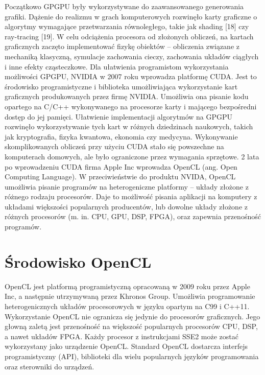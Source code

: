Początkowo GPGPU były wykorzystywane do zaawansowanego generowania grafiki. Dążenie do realizmu w grach komputerowych rozwinęło karty graficzne o algorytmy wymagające przetwarzania równoległego, takie jak shading [18] czy ray-tracing [19]. W celu odciążenia procesora od złożonych obliczeń, na kartach graficznych zaczęto implementować fizykę obiektów – obliczenia związane z mechaniką klasyczną, symulacje zachowania cieczy, zachowania układów ciągłych i inne efekty cząsteczkowe. Dla ułatwienia programistom wykorzystania możliwości GPGPU, NVIDIA w 2007 roku wprowadza platformę CUDA. Jest to środowisko programistyczne i biblioteka umożliwiająca wykorzystanie kart graficznych produkowanych przez firmę NVIDIA. Umożliwia ona pisanie kodu opartego na C/C++ wykonywanego na procesorze karty i mającego bezpośredni dostęp do jej pamięci. Ułatwienie implementacji algorytmów na GPGPU rozwinęło wykorzystywanie tych kart w różnych dziedzinach naukowych, takich jak kryptografia, fizyka kwantowa, ekonomia czy medycyna. Wykonywanie  skomplikowanych obliczeń przy użyciu CUDA stało się powszechne na komputerach domowych, ale było ograniczone przez wymagania sprzętowe. 2 lata po wprowadzeniu CUDA firma Apple Inc wprowadza OpenCL (ang. Open Computing Language). W przeciwieństwie do produktu NVIDA, OpenCL umożliwia pisanie programów na heterogeniczne platformy – układy złożone z różnego rodzaju procesorów. Daje to możliwość pisania aplikacji na komputery z układami większości popularnych producentów, lub dowolne układy złożone z różnych procesorów (m. in. CPU, GPU, DSP, FPGA), oraz zapewnia przenośność programów.


\section{Środowisko OpenCL}\label{sec:OpenCL}

OpenCL jest platformą programistyczną opracowaną w 2009 roku przez Apple Inc, a następnie utrzymywaną przez Khronos Group. Umożliwia programowanie heterogenicznych układów procesorowych w języku opartym na C99 i C++11. Wykorzystanie OpenCL nie ogranicza się jedynie do procesorów graficznych. Jego głowną zaletą jest przenośność na większość popularnych procesorów CPU, DSP, a nawet układów FPGA. Każdy procesor z instrukcjami SSE2 może zostać wykorzystany jako urządzenie OpenCL. Standard OpenCL dostarcza interfejs programistyczny (API), biblioteki dla wielu popularnych języków programowania oraz sterowniki do urządzeń.

